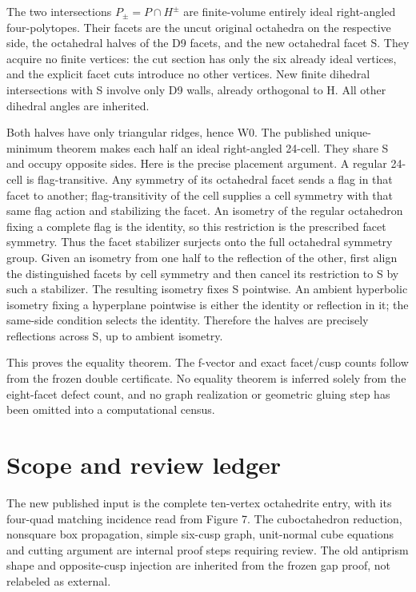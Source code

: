 \documentclass[11pt]{article}
\begin{document}
The two intersections \(P_\pm=P\cap H^\pm\) are finite-volume entirely ideal right-angled four-polytopes. Their facets are the uncut original octahedra on the respective side, the octahedral halves of the D9 facets, and the new octahedral facet S. They acquire no finite vertices: the cut section has only the six already ideal vertices, and the explicit facet cuts introduce no other vertices. New finite dihedral intersections with S involve only D9 walls, already orthogonal to H. All other dihedral angles are inherited.

Both halves have only triangular ridges, hence W0. The published unique-minimum theorem makes each half an ideal right-angled 24-cell. They share S and occupy opposite sides. Here is the precise placement argument. A regular 24-cell is flag-transitive. Any symmetry of its octahedral facet sends a flag in that facet to another; flag-transitivity of the cell supplies a cell symmetry with that same flag action and stabilizing the facet. An isometry of the regular octahedron fixing a complete flag is the identity, so this restriction is the prescribed facet symmetry. Thus the facet stabilizer surjects onto the full octahedral symmetry group. Given an isometry from one half to the reflection of the other, first align the distinguished facets by cell symmetry and then cancel its restriction to S by such a stabilizer. The resulting isometry fixes S pointwise. An ambient hyperbolic isometry fixing a hyperplane pointwise is either the identity or reflection in it; the same-side condition selects the identity. Therefore the halves are precisely reflections across S, up to ambient isometry.

This proves the equality theorem. The f-vector and exact facet/cusp counts follow from the frozen double certificate. No equality theorem is inferred solely from the eight-facet defect count, and no graph realization or geometric gluing step has been omitted into a computational census.

\section{Scope and review ledger}\label{scope-and-review-ledger}

The new published input is the complete ten-vertex octahedrite entry, with its four-quad matching incidence read from Figure 7. The cuboctahedron reduction, nonsquare box propagation, simple six-cusp graph, unit-normal cube equations and cutting argument are internal proof steps requiring review. The old antiprism shape and opposite-cusp injection are inherited from the frozen gap proof, not relabeled as external.
\end{document}
